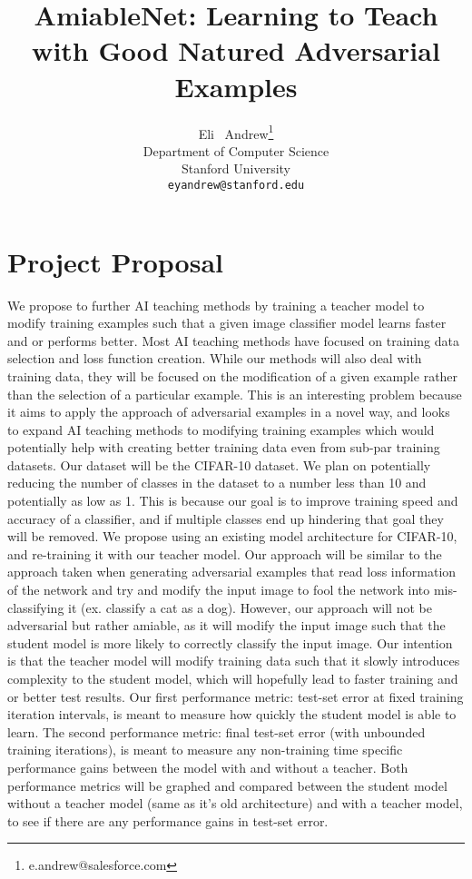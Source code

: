 \documentclass{article}
\title{AmiableNet: Learning to Teach with Good Natured Adversarial Examples}
\author{
  Eli ~Andrew\thanks{e.andrew@salesforce.com} \\
  Department of Computer Science\\
  Stanford University\\
  \texttt{eyandrew@stanford.edu} \\
}
\begin{document}


\maketitle

\section{Project Proposal}	
We propose to further AI teaching methods by training a teacher model to modify training
examples such that a given image classifier model learns faster and or performs better. Most AI teaching methods have
focused on training data selection and loss function creation. While
our methods will also deal with training data, they will be focused on the modification of a given
example rather than the selection of a particular example. This is an interesting problem because it aims to apply the
approach of adversarial examples in a novel way, and looks to expand AI teaching methods to modifying training examples
which would potentially help with creating better training data even from sub-par training datasets.
Our dataset will be the CIFAR-10 dataset. We plan on potentially reducing the number of classes in the 
dataset to a number less than 10 and potentially as low as 1. This is because our goal is to improve training speed
and accuracy of a classifier, and if multiple classes end up hindering that goal they will be removed.
We propose using an existing model architecture for CIFAR-10, and re-training it with
our teacher model. Our approach will be similar to the approach taken when generating adversarial examples that read loss information of
the network and try and modify the input image to fool the network into mis-classifying it (ex. classify a cat as a dog). However,
our approach will not be adversarial but rather amiable, as it will modify the input image such that the student model
is more likely to correctly classify the input image. Our intention is that the teacher model will modify
training data such that it slowly introduces complexity to the student model, which will hopefully lead to faster training and or
better test results.
Our first performance metric: test-set error at fixed training
iteration intervals, is meant to measure how quickly the student model is able to learn. 
The second performance metric: final test-set error (with unbounded training iterations), is meant to measure any non-training time specific performance gains between the model with and without a
teacher.
Both performance metrics will be graphed and compared between the student model without a teacher model (same as it's old architecture) and with a teacher model, to see if there are any performance
gains in test-set error.
\end{document}
